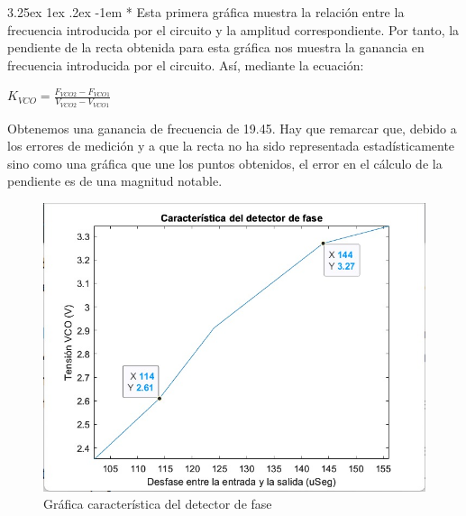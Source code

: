 \documentclass[12pt]{article}
\makeatletter
\renewcommand\paragraph{\@startsection{paragraph}{5}{\z@}%
  {3.25ex \@plus1ex \@minus.2ex}%
  {-1em}%
  {\normalfont\normalsize\bfseries}}
\makeatother
\begin{document}
    \paragraph*{}
    Esta primera gráfica muestra la relación entre la frecuencia introducida por el circuito y la amplitud correspondiente. Por tanto, la pendiente de la recta obtenida
para esta gráfica nos muestra la ganancia en frecuencia introducida por el circuito. Así, mediante la ecuación:

  \begin{center}
    $K_{VCO} = \frac{F_{VCO2} - F_{VCO1}}{V_{VCO2} - V_{VCO1}}$
  \end{center}
    
  Obtenemos una ganancia de frecuencia de 19.45. Hay que remarcar que, debido a los errores de medición y a que la recta no ha sido representada estadísticamente sino como
  una gráfica que une los puntos obtenidos,
  el error en el cálculo de la pendiente es de una magnitud notable.

    \begin{figure}[H]
      \centering
      \includegraphics[width=1\linewidth]{img/grafica2.jpeg}
      \caption{Gráfica característica del detector de fase}%
      \label{fig:grafica2}
    \end{figure}
    
\end{document}
